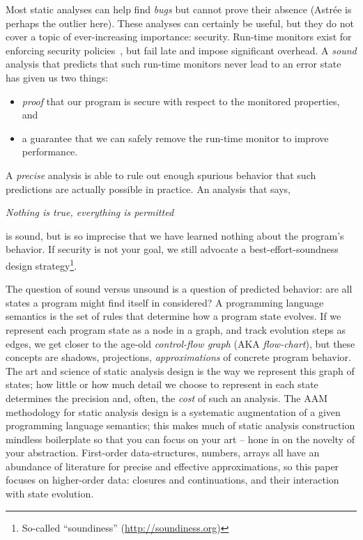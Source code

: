 Most static analyses can help find \emph{bugs} but cannot prove their absence (Astr\'ee is perhaps the outlier here).
%
These analyses can certainly be useful, but they do not cover a topic of ever-increasing importance: security.
%
Run-time monitors exist for enforcing security policies~\citep{ianjohnson:Erlingsson:2004:IRM:997617}, but fail late and impose significant overhead.
%
A \emph{sound} analysis that predicts that such run-time monitors never lead to an error state has given us two things:
\begin{itemize}
\item{\emph{proof} that our program is secure with respect to the monitored properties, and}
\item{a guarantee that we can safely remove the run-time monitor to improve performance.}
\end{itemize}
A \emph{precise} analysis is able to rule out enough spurious behavior that such predictions are actually possible in practice.
%
An analysis that says,
\begin{center}
  \textit{Nothing is true, everything is permitted}
\end{center}
is sound, but is so imprecise that we have learned nothing about the program's behavior. 
%
If security is not your goal, we still advocate a best-effort-soundness design strategy\footnote{So-called ``soundiness'' (\url{http://soundiness.org})}.

The question of sound versus unsound is a question of predicted behavior: are all states a program might find itself in considered?
%
A programming language semantics is the set of rules that determine how a program state evolves.
%
If we represent each program state as a node in a graph, and track evolution steps as edges, we get closer to the age-old \emph{control-flow graph} (AKA \emph{flow-chart}), but these concepts are shadows, projections, \emph{approximations} of concrete program behavior.
%
The art and science of static analysis design is the way we represent this graph of states; how little or how much detail we choose to represent in each state determines the precision and, often, the \emph{cost} of such an analysis.
%
The AAM methodology for static analysis design is a systematic augmentation of a given programming language semantics; this makes much of static analysis construction mindless boilerplate so that you can focus on your art -- hone in on the novelty of your abstraction.
%
First-order data-structures, numbers, arrays all have an abundance of literature for precise and effective approximations, so this paper focuses on higher-order data: closures and continuations, and their interaction with state evolution.
%

